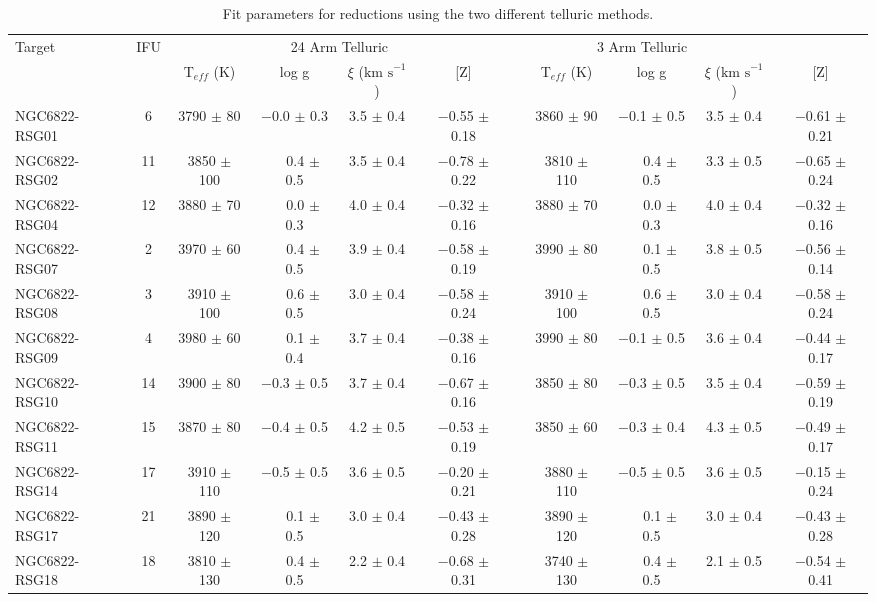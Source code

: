 \documentclass[iop]{emulateapj}
\def\kms{$\mbox{km s}^{-1}$}
\def\pp{$\phantom{-}$}
\def\o{$\phantom{0}$}
\begin{document}
\begin{table*}
\begin{center}
\caption{
Fit parameters for reductions using the two different telluric methods.
\label{tb:stellar-params}
         }
\scriptsize
\begin{tabular}{lc cccc c cccc}
 \hline
 \hline
  Target  & IFU &  \multicolumn{4}{c}{24 Arm Telluric} & \multicolumn{4}{c}{3 Arm Telluric}\\
  \cline{3-6}  \cline{8-11}
 &  & T$_{eff}$ (K) & log g & $\xi$ (\kms) & [Z] & & T$_{eff}$ (K) & log g & $\xi$ (\kms) & [Z]\\
  \hline
NGC6822-RSG01 & 6 & 3790 $\pm$ 80\o & $-$0.0 $\pm$ 0.3 & 3.5 $\pm$ 0.4 & $-$0.55 $\pm$ 0.18 & & 3860 $\pm$ 90\o & $-$0.1 $\pm$ 0.5 &  3.5 $\pm$ 0.4 & $-$0.61 $\pm$ 0.21 \\
NGC6822-RSG02 & 11& 3850 $\pm$ 100  & \pp0.4 $\pm$ 0.5 & 3.5 $\pm$ 0.4 & $-$0.78 $\pm$ 0.22 & & 3810 $\pm$ 110  & \pp0.4 $\pm$ 0.5 &  3.3 $\pm$ 0.5 & $-$0.65 $\pm$ 0.24 \\
NGC6822-RSG04 & 12& 3880 $\pm$ 70\o & \pp0.0 $\pm$ 0.3 & 4.0 $\pm$ 0.4 & $-$0.32 $\pm$ 0.16 & & 3880 $\pm$ 70\o & \pp0.0 $\pm$ 0.3 &  4.0 $\pm$ 0.4 & $-$0.32 $\pm$ 0.16 \\
NGC6822-RSG07 & 2 & 3970 $\pm$ 60\o & \pp0.4 $\pm$ 0.5 & 3.9 $\pm$ 0.4 & $-$0.58 $\pm$ 0.19 & & 3990 $\pm$ 80\o & \pp0.1 $\pm$ 0.5 &  3.8 $\pm$ 0.5 & $-$0.56 $\pm$ 0.14 \\
NGC6822-RSG08 & 3 & 3910 $\pm$ 100  & \pp0.6 $\pm$ 0.5 & 3.0 $\pm$ 0.4 & $-$0.58 $\pm$ 0.24 & & 3910 $\pm$ 100  & \pp0.6 $\pm$ 0.5 &  3.0 $\pm$ 0.4 & $-$0.58 $\pm$ 0.24 \\
NGC6822-RSG09 & 4 & 3980 $\pm$ 60\o & \pp0.1 $\pm$ 0.4 & 3.7 $\pm$ 0.4 & $-$0.38 $\pm$ 0.16 & & 3990 $\pm$ 80\o & $-$0.1 $\pm$ 0.5 &  3.6 $\pm$ 0.4 & $-$0.44 $\pm$ 0.17 \\
NGC6822-RSG10 & 14& 3900 $\pm$ 80\o & $-$0.3 $\pm$ 0.5 & 3.7 $\pm$ 0.4 & $-$0.67 $\pm$ 0.16 & & 3850 $\pm$ 80\o & $-$0.3 $\pm$ 0.5 &  3.5 $\pm$ 0.4 & $-$0.59 $\pm$ 0.19 \\
NGC6822-RSG11 & 15& 3870 $\pm$ 80\o & $-$0.4 $\pm$ 0.5 & 4.2 $\pm$ 0.5 & $-$0.53 $\pm$ 0.19 & & 3850 $\pm$ 60\o & $-$0.3 $\pm$ 0.4 &  4.3 $\pm$ 0.5 & $-$0.49 $\pm$ 0.17 \\
NGC6822-RSG14 & 17& 3910 $\pm$ 110  & $-$0.5 $\pm$ 0.5 & 3.6 $\pm$ 0.5 & $-$0.20 $\pm$ 0.21 & & 3880 $\pm$ 110  & $-$0.5 $\pm$ 0.5 &  3.6 $\pm$ 0.5 & $-$0.15 $\pm$ 0.24 \\
NGC6822-RSG17 & 21& 3890 $\pm$ 120  & \pp0.1 $\pm$ 0.5 & 3.0 $\pm$ 0.4 & $-$0.43 $\pm$ 0.28 & & 3890 $\pm$ 120  & \pp0.1 $\pm$ 0.5 &  3.0 $\pm$ 0.4 & $-$0.43 $\pm$ 0.28 \\
NGC6822-RSG18 & 18& 3810 $\pm$ 130  & \pp0.4 $\pm$ 0.5 & 2.2 $\pm$ 0.4 & $-$0.68 $\pm$ 0.31 & & 3740 $\pm$ 130  & \pp0.4 $\pm$ 0.5 &  2.1 $\pm$ 0.5 & $-$0.54 $\pm$ 0.41 \\


\end{tabular}
\end{center}
\end{table*}
\end{document}
